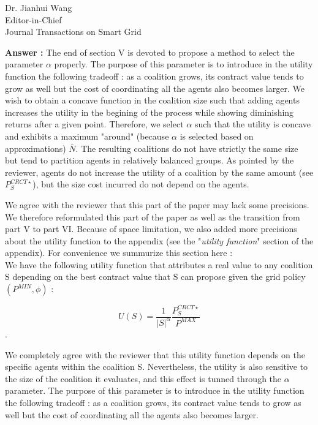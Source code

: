 \documentclass{letter}
\begin{document}
\begin{letter}{Dr. Jianhui Wang \\ Editor-in-Chief \\ Journal Transactions on Smart Grid }
\begin{itemize}
\begin{itemize}
\textbf{Answer :} The end of section V is devoted to propose a method to select the parameter $ \alpha $ properly. The purpose of this parameter is to introduce in the utility function the following tradeoff : as a coalition grows, its contract value tends to grow as well but the cost of coordinating all the agents also becomes larger. We wish to obtain a concave function in the coalition size such that adding agents increases the utility in the begining of the process while showing diminishing returns after a given point. Therefore, we select $ \alpha $ such that the utility is concave and exhibits a maximum "around" (because $ \alpha $ is selected based on approximations) $\bar{N} $. The resulting coalitions do not have strictly the same size but tend to partition agents in relatively balanced groups. As pointed by the reviewer, agents do not increase the utility of a coalition by the same amount (see $P_S^{CRCT \star}$), but the size cost incurred do not depend on the agents.


We agree with the reviewer that this part of the paper may lack some precisions. We therefore reformulated this part of the paper as well as the transition from part V to part VI. Because of space limitation, we also added more precisions about the utility function to the appendix (see the "\textit{utility function}" section of the appendix). For convenience we summurize this section here :
\\
We have the following utility function that attributes a real value to any coalition S depending on the best contract value that S can propose given the grid policy $ (P^{MIN},\phi)$ : 

\[ U(S) = \frac{1}{|S|^{\alpha}} \frac{ P_S^{CRCT \star} }{P^{MAX}} \]. 

We completely agree with the reviewer that this utility function depends on the specific agents within the coalition S. Nevertheless, the utility is also sensitive to the size of the coalition it evaluates, and this effect is tunned through the $ \alpha $ parameter. The purpose of this parameter is to introduce in the utility function the following tradeoff : as a coalition grows, its contract value tends to grow as well but the cost of coordinating all the agents also becomes larger. 



\end{itemize}
\end{itemize}
\end{letter}
\end{document}
